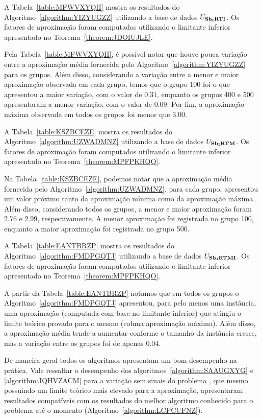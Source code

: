 A Tabela~\ref{table:MFWVXYQH} mostra os resultados do Algoritmo~\ref{algorithm:YIZYUGZZ} utilizando a base de dados $U_{\textbf{Sb\textsubscript{I}RTI}}{}$. Os fatores de aproximação foram computados utilizando o limitante inferior apresentado no Teorema~\ref{theorem:JDOIUJLE}.



Pela Tabela~\ref{table:MFWVXYQH}, é possível notar que houve pouca variação entre a aproximação média fornecida pelo Algoritmo~\ref{algorithm:YIZYUGZZ} para os grupos. Além disso, considerando a variação entre a menor e maior aproximação observada em cada grupo, temos que o grupo 100 foi o que apresentou a maior variação, com o valor de $0.31$, enquanto os grupos 400 e 500 apresentaram a menor variação, com o valor de $0.09$. Por fim, a aproximação máxima observada em todos os grupos foi menor que $3.00$.

A Tabela~\ref{table:KSZBCEZE} mostra os resultados do Algoritmo~\ref{algorithm:UZWADMNZ} utilizando a base de dados $U_{\textbf{Sb\textsubscript{I}RTM}}{}$. Os fatores de aproximação foram computados utilizando o limitante inferior apresentado no Teorema~\ref{theorem:MPFPKHQO}.



Na Tabela~\ref{table:KSZBCEZE}, podemos notar que a aproximação média fornecida pelo Algoritmo~\ref{algorithm:UZWADMNZ}, para cada grupo, apresentou um valor próximo tanto da aproximação mínima como da aproximação máxima. Além disso, considerando todos os grupos, a menor e maior aproximação foram $2.76$ e $2.99$, respectivamente. A menor aproximação foi registrada no grupo 100, enquanto a maior aproximação foi registrada no grupo 500.

A Tabela~\ref{table:EANTBRZP} mostra os resultados do Algoritmo~\ref{algorithm:FMDPGQTJ} utilizando a base de dados $U_{\textbf{Sb\textsubscript{I}RTMI}}{}$. Os fatores de aproximação foram computados utilizando o limitante inferior apresentado no Teorema~\ref{theorem:MPFPKHQO}.



A partir da Tabela~\ref{table:EANTBRZP} notamos que em todos os grupos o Algoritmo~\ref{algorithm:FMDPGQTJ} apresentou, para pelo menos uma instância, uma aproximação (computada com base no limitante inferior) que atingiu o limite teórico provado para o mesmo (coluna aproximação máxima). Além disso, a aproximação média tende a aumentar conforme o tamanho da instância cresce, mas a variação entre os grupos foi de apenas $0.04$.

De maneira geral todos os algoritmos apresentam um bom desempenho na prática. Vale ressaltar o desempenho dos algoritmos~\ref{algorithm:SAAUGXYG} e \ref{algorithm:JQHVZACM} para a variação sem sinais do problema \SbIRT{}, que mesmo possuindo um limite teórico mais elevado para a aproximação, apresentaram resultados compatíveis com os resultados do melhor algoritmo conhecido para o problema até o momento (Algoritmo~\ref{algorithm:LCPCUFNZ}).

